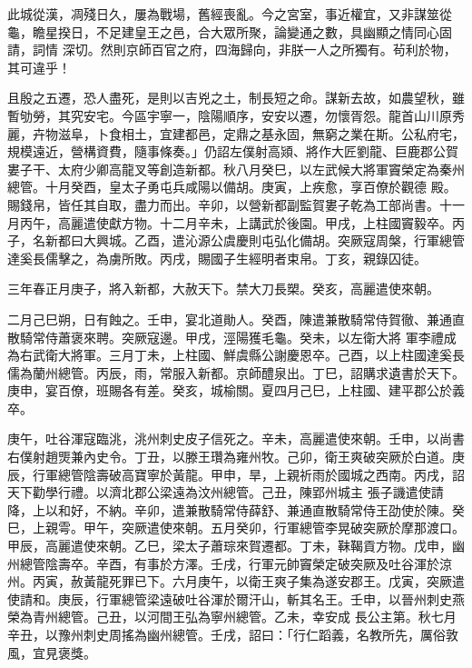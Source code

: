 \begin{pinyinscope}
 此城從漢，凋殘日久，屢為戰場，舊經喪亂。今之宮室，事近權宜，又非謀筮從龜，瞻星揆日，不足建皇王之邑，合大眾所聚，論變通之數，具幽顯之情同心固請，詞情
 深切。然則京師百官之府，四海歸向，非朕一人之所獨有。茍利於物，其可違乎！



 且殷之五遷，恐人盡死，是則以吉兇之土，制長短之命。謀新去故，如農望秋，雖暫劬勞，其究安宅。今區宇寧一，陰陽順序，安安以遷，勿懷胥怨。龍首山川原秀麗，卉物滋阜，卜食相土，宜建都邑，定鼎之基永固，無窮之業在斯。公私府宅，規模遠近，營構資費，隨事條奏。」仍詔左僕射高熲、將作大匠劉龍、巨鹿郡公賀婁子干、太府少卿高龍叉等創造新都。秋八月癸巳，以左武候大將軍竇榮定為秦州總管。十月癸酉，皇太子勇屯兵咸陽以備胡。庚寅，上疾愈，享百僚於觀德
 殿。賜錢帛，皆任其自取，盡力而出。辛卯，以營新都副監賀婁子乾為工部尚書。十一月丙午，高麗遣使獻方物。十二月辛未，上講武於後園。甲戌，上柱國竇毅卒。丙子，名新都曰大興城。乙酉，遣沁源公虞慶則屯弘化備胡。突厥寇周槃，行軍總管達奚長儒擊之，為虜所敗。丙戌，賜國子生經明者束帛。丁亥，親錄囚徒。



 三年春正月庚子，將入新都，大赦天下。禁大刀長槊。癸亥，高麗遣使來朝。



 二月己巳朔，日有蝕之。壬申，宴北道勛人。癸酉，陳遣兼散騎常侍賀徹、兼通直散騎常侍蕭褒來聘。突厥寇邊。甲戌，涇陽獲毛龜。癸未，以左衛大將
 軍李禮成為右武衛大將軍。三月丁未，上柱國、鮮虞縣公謝慶恩卒。己酉，以上柱國達奚長儒為蘭州總管。丙辰，雨，常服入新都。京師醴泉出。丁巳，詔購求遺書於天下。庚申，宴百僚，班賜各有差。癸亥，城榆關。夏四月己巳，上柱國、建平郡公於義卒。



 庚午，吐谷渾寇臨洮，洮州刺史皮子信死之。辛未，高麗遣使來朝。壬申，以尚書右僕射趙煚兼內史令。丁丑，以滕王瓚為雍州牧。己卯，衛王爽破突厥於白道。庚辰，行軍總管陰壽破高寶寧於黃龍。甲申，旱，上親祈雨於國城之西南。丙戌，詔天下勸學行禮。以濟北郡公梁遠為汶州總管。己丑，陳郢州城主
 張子譏遣使請降，上以和好，不納。辛卯，遣兼散騎常侍薛舒、兼通直散騎常侍王劭使於陳。癸巳，上親雩。甲午，突厥遣使來朝。五月癸卯，行軍總管李晃破突厥於摩那渡口。甲辰，高麗遣使來朝。乙巳，梁太子蕭琮來賀遷都。丁未，靺鞨貢方物。戊申，幽州總管陰壽卒。辛酉，有事於方澤。壬戌，行軍元帥竇榮定破突厥及吐谷渾於涼州。丙寅，赦黃龍死罪已下。六月庚午，以衛王爽子集為遂安郡王。戊寅，突厥遣使請和。庚辰，行軍總管梁遠破吐谷渾於爾汗山，斬其名王。壬申，以晉州刺史燕榮為青州總管。己丑，以河間王弘為寧州總管。乙未，幸安成
 長公主第。秋七月辛丑，以豫州刺史周搖為幽州總管。壬戌，詔曰：「行仁蹈義，名教所先，厲俗敦風，宜見褒獎。




\end{pinyinscope}
